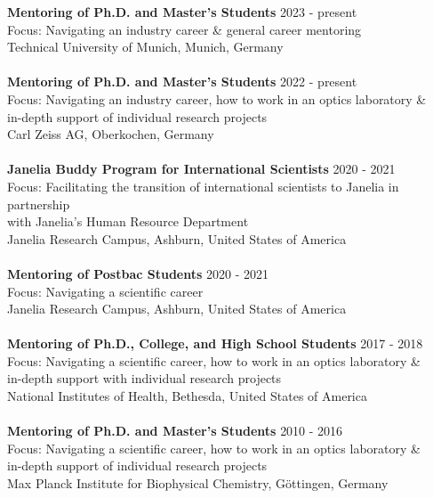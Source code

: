 \documentclass[margin,line]{res}
\begin{document}
\begin{resume}
{\bf Mentoring of Ph.D. and Master's Students} \hfill 2023 - present\\
Focus: Navigating an industry career \& general career mentoring\\
Technical University of Munich, Munich, Germany\\
\vspace*{-3mm}\\
{\bf Mentoring of Ph.D. and Master's Students} \hfill 2022 - present\\
Focus: Navigating an industry career, how to work in an optics laboratory \&\\
in-depth support of individual research projects\\
Carl Zeiss AG, Oberkochen, Germany\\
\vspace*{-3mm}\\
{\bf  Janelia Buddy Program for International Scientists} \hfill 2020 - 2021\\
Focus: Facilitating the transition of international scientists to Janelia in partnership \\
with Janelia's Human Resource Department\\
Janelia Research Campus, Ashburn, United States of America\\
\vspace*{-3mm}\\
{\bf  Mentoring of Postbac Students} \hfill 2020 - 2021\\
Focus: Navigating a scientific career\\
Janelia Research Campus, Ashburn, United States of America\\
\vspace*{-3mm}\\
{\bf  Mentoring of Ph.D., College, and High School Students}  \hfill 2017 - 2018\\
Focus: Navigating a scientific career, how to work in an optics laboratory \&\\
in-depth support with individual research projects\\
National Institutes of Health, Bethesda, United States of America\\
\vspace*{-3mm}\\
{\bf Mentoring of Ph.D. and Master's Students}  \hfill {2010 - 2016}\\
Focus: Navigating a scientific career, how to work in an optics laboratory \&\\
in-depth support of individual research projects\\
Max Planck Institute for Biophysical Chemistry, Göttingen, Germany 


\end{resume}
\end{document}

